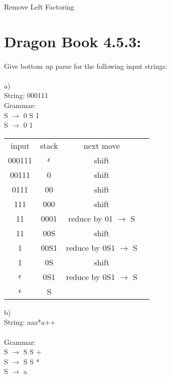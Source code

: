 \documentclass[letterpaper, 10pt,DIV=13]{scrartcl}
\numberwithin{equation}{section} %
\numberwithin{figure}{section} %
\numberwithin{table}{section} %
\begin{document}
Remove Left Factoring

\section{Dragon Book 4.5.3: }

\paragraph{} Give bottom up parse for the following input strings:\\
\\
a)\\
String: 000111\\

Grammar:\\
S $\to$ 0 S 1\\
S $\to$ 0 1\\

\begin{center}
\begin{tabular}{ |c|c|c|c| } 
 \hline
 input & stack & next move\\ 
 000111 & $\epsilon$  & shift \\ 
 00111 & 0  & shift \\ 
 0111 & 00  & shift \\ 
 111 & 000  & shift \\ 
 11 & 0001  & reduce by 01 $\to$ S \\ 
 11 & 00S  & shift \\ 
 1 & 00S1  & reduce by 0S1 $\to$ S \\ 
 1 & 0S & shift \\ 
 $\epsilon$ & 0S1  & reduce by 0S1 $\to$ S \\ 
 $\epsilon$ & S  &  \\ 
 \hline
\end{tabular}
\end{center}

b)\\
String: aaa*a++\\
\\
Grammar:\\
S $\to$ S S +\\
S $\to$ S S *\\
S $\to$ a\\
\end{document}
